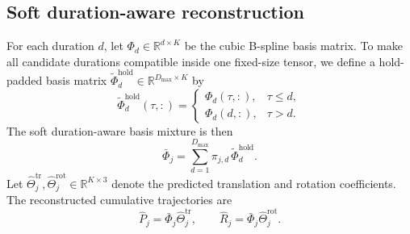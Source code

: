 \documentclass[10pt,twocolumn,letterpaper]{article}
\begin{document}
\subsection{Soft duration-aware reconstruction}
For each duration $d$, let $\Phi_d\in\mathbb{R}^{d\times K}$ be the cubic B-spline basis matrix. To make all candidate durations compatible inside one fixed-size tensor, we define a hold-padded basis matrix $\widetilde\Phi_d^{\mathrm{hold}}\in\mathbb{R}^{D_{\max}\times K}$ by
\begin{equation}
\widetilde\Phi_d^{\mathrm{hold}}(\tau,:)=
\begin{cases}
\Phi_d(\tau,:), & \tau\le d,\\
\Phi_d(d,:), & \tau>d.
\end{cases}
\end{equation}
The soft duration-aware basis mixture is then
\begin{equation}
\bar\Phi_j = \sum_{d=1}^{D_{\max}} \pi_{j,d}\,\widetilde\Phi_d^{\mathrm{hold}}.
\end{equation}
Let $\hat\Theta_j^{\mathrm{tr}},\hat\Theta_j^{\mathrm{rot}}\in\mathbb{R}^{K\times 3}$ denote the predicted translation and rotation coefficients. The reconstructed cumulative trajectories are
\begin{equation}
\hat P_j = \bar\Phi_j\hat\Theta_j^{\mathrm{tr}},
\qquad
\hat R_j = \bar\Phi_j\hat\Theta_j^{\mathrm{rot}}.
\end{equation}
\end{document}
